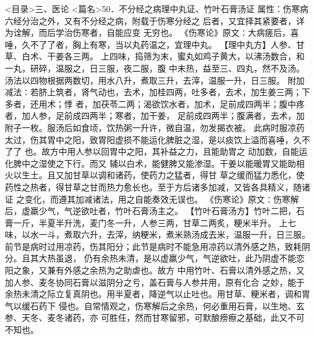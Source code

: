 \documentclass[a4paper,12pt,UTF8,twoside]{ctexbook}
\begin{document}
<目录>三、医论
<篇名>50．不分经之病理中丸证、竹叶石膏汤证
属性：伤寒病六经分治之外，又有不分经之病，附载于伤寒分经之 
后者，又宜择其紧要者，详为诠解，而后学治伤寒者，自能应变 
无穷也。 
《伤寒论》原文∶大病瘥后，喜唾，久不了了者，胸上有寒，当以丸药温之，宜理中丸。 
【理中丸方】人参、甘草、白术、干姜各三两。 
上四味，捣筛为末，蜜丸如鸡子黄大，以沸汤数合，和一丸，研碎，温服之，日三服，夜二服，腹 
中未热，益至三、四丸，然不及汤。汤法以四物根据两数切，用水八升，煮取三升，去滓，温服一升，日三服。 
附加减法∶若脐上筑者，肾气动也，去术，加桂四两，吐多者，去术，加生姜三两；下多者，还用术；悸 
者，加茯苓二两；渴欲饮水者，加术，足前成四两半；腹中疼者，加人参，足前成四两半；寒者，加干姜， 
足前成四两半；腹满者，去术，加附子一枚。服汤后如食顷，饮热粥一升许，微自温，勿发揭衣被。 
此病时服凉药太过，伤其胃中之阳，致胃阳虚损不能运化脾脏之湿，是以痰饮上溢而喜唾，久不了了 
也。故方中用人参以回胃中之阳，其补益之力，且能助胃之 动加数，自能运化脾中之湿使之下行。而又 
辅以白术，能健脾又能渗湿。干姜以能暖胃又能助相火以生土。且又加甘草以调和诸药，使药力之猛者，得甘 
草之缓而猛力悉化，使药性之热者，得甘草之甘而热力愈长也。至于方后诸多加减，又皆各具精义，随诸证 
之变化，而遵其加减诸法，用之自能奏效无误也。 
《伤寒论》原文∶伤寒解后，虚羸少气，气逆欲吐者，竹叶石膏汤主之。 
【竹叶石膏汤方】竹叶二把，石膏一斤，半夏半升洗，麦门冬一升，人参三两，甘草二两炙，粳米半升。 
上七味，以水一斗，煮取六升，去滓，纳粳米，煮米熟汤成去米，温服一升，日三服。 
前节是病时过用凉药，伤其阳分；此节是病时不能急用凉药以清外感之热，致耗阴分。且其大热虽退， 
仍有余热未清，是以虚羸少气，气逆欲吐，此乃阴虚不能恋阳之象，又兼有外感之余热为之助虐也。故方 
中用竹叶、石膏以清外感之热，又加人参、麦冬协同石膏以滋阴分之亏，盖石膏与人参并用，原有化合 
之妙，能于余热未清之际立复真阴也。用半夏者，降逆气以止吐也。用甘草、粳米者，调和胃气以缓石药下 
侵也。自常情观之，伤寒解后之余热，何必重用石膏，以生地、玄参、天冬、麦冬诸药，亦 
可胜任，然而甘寒留邪，可默酿痨瘵之基础，此又不可不知也。 
\end{document}
